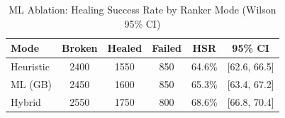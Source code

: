 \begin{table}[h]
\centering
\caption{ML Ablation: Healing Success Rate by Ranker Mode (Wilson 95\% CI)}
\label{tab:ml_ablation}
\begin{tabular}{lccccc}
\toprule
Mode & Broken & Healed & Failed & HSR & 95\% CI \\
\midrule
Heuristic & 2400 & 1550 & 850 & 64.6\% & [62.6, 66.5] \\
ML (GB) & 2450 & 1600 & 850 & 65.3\% & [63.4, 67.2] \\
Hybrid & 2550 & 1750 & 800 & 68.6\% & [66.8, 70.4] \\
\bottomrule
\end{tabular}
\end{table}